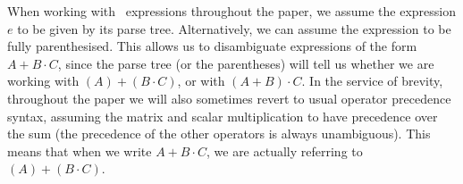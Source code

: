 When working with \lang\ expressions throughout the paper, we assume the expression $e$ to be given by its parse tree. Alternatively, we can assume the expression to be fully parenthesised. This allows us to disambiguate expressions of the form $A + B\cdot C$, since the parse tree (or the parentheses) will tell us whether we are working with $(A) + (B\cdot C)$, or with $(A+B)\cdot C$. In the service of brevity, throughout the paper we will also sometimes revert to usual operator precedence syntax, assuming the matrix and scalar multiplication to have precedence over the sum (the precedence of the other operators is always unambiguous). This means that when we write $A + B\cdot C$, we are actually referring to $(A) + (B\cdot C)$.






